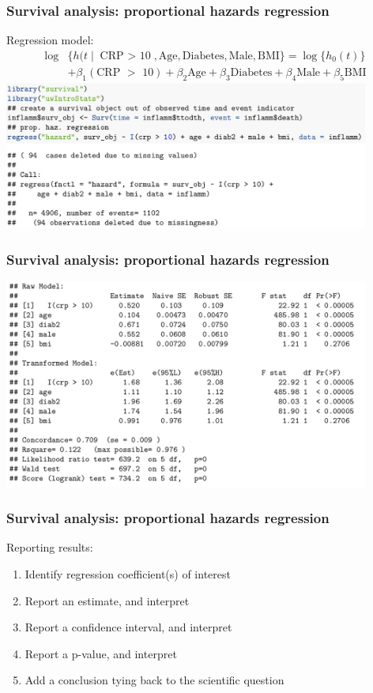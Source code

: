 \documentclass[12pt, 
hyperref={colorlinks=true, linkcolor=blue, urlcolor=cyan},dvipsnames]{beamer}
\begin{document}

\begin{frame}
\frametitle{Survival analysis: proportional hazards regression}
Regression model: 
\begin{align*}
\log & \{h(t \mid \text{CRP $>$ 10}, \text{Age}, \text{Diabetes}, \text{Male}, \text{BMI}\} =  \log\{h_0(t)\} \\
&+ \beta_1 (\text{CRP $>$ 10}) + \beta_2 \text{Age} + \beta_3 \text{Diabetes} + \beta_4 \text{Male} + \beta_5 \text{BMI}
\end{align*}
\hspace*{0.5cm}\includegraphics[width=0.9\textwidth]{figs/inflamm_hazard_crp_1.png}
\end{frame}

\begin{frame}
\frametitle{Survival analysis: proportional hazards regression}
\hspace*{0.5cm}\includegraphics[width=0.9\textwidth]{figs/inflamm_hazard_crp_2.png}
\end{frame}

\begin{frame}
\frametitle{Survival analysis: proportional hazards regression}
Reporting results: 
\begin{enumerate}
\item Identify regression coefficient(s) of interest
\item Report an estimate, and interpret
\item Report a confidence interval, and interpret
\item Report a p-value, and interpret
\item Add a conclusion tying back to the scientific question
\end{enumerate}
\end{frame}
\end{document}

